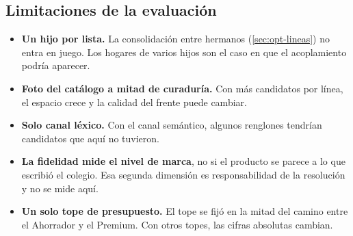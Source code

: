\subsection{Limitaciones de la evaluación}

\begin{itemize}
  \item \textbf{Un hijo por lista.} La consolidación entre hermanos
        (\cref{sec:opt-lineas}) no entra en juego. Los hogares de varios hijos
        son el caso en que el acoplamiento podría aparecer.
  \item \textbf{Foto del catálogo a mitad de curaduría.} Con más candidatos
        por línea, el espacio crece y la calidad del frente puede cambiar.
  \item \textbf{Solo canal léxico.} Con el canal semántico, algunos renglones
        tendrían candidatos que aquí no tuvieron.
  \item \textbf{La fidelidad mide el nivel de marca}, no si el producto se
        parece a lo que escribió el colegio. Esa segunda dimensión es
        responsabilidad de la resolución y no se mide aquí.
  \item \textbf{Un solo tope de presupuesto.} El tope se fijó en la mitad del
        camino entre el Ahorrador y el Premium. Con otros topes, las cifras
        absolutas cambian.
\end{itemize}
